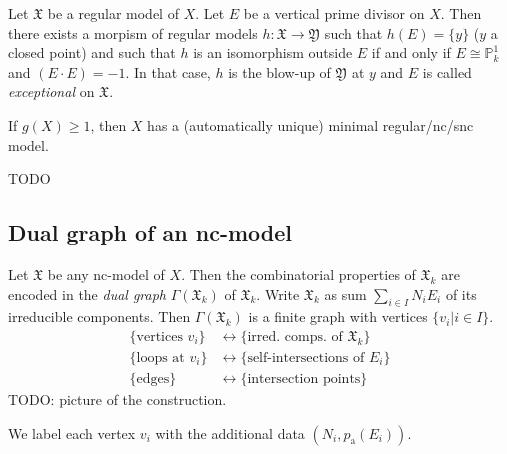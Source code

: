 \begin{theorem}
	Let $\mathfrak{X}$ be a regular model of $X$. Let $E$ be a vertical
	prime divisor on $X$. Then there exists a morpism of regular models $h
	\colon \mathfrak{X} \to \mathfrak{Y}$ such that $h(E) = \{y\}$ ($y$ a
	closed point) and such that $h$ is an isomorphism outside $E$ if and
	only if $E \cong \mathbb{P}^{1}_{k}$ and $(E \cdot E) = -1$. In that
	case, $h$ is the blow-up of $\mathfrak{Y}$ at $y$ and $E$ is called
	\emph{exceptional} on $\mathfrak{X}$.
\end{theorem}

\begin{exercise}
	If $g(X) \ge 1$, then $X$ has a (automatically unique) minimal
	regular/nc/snc model.
	\begin{solution}
		TODO
	\end{solution}
\end{exercise}

\subsection{Dual graph of an nc-model}

Let $\mathfrak{X}$ be any nc-model of $X$. Then the combinatorial properties of
$\mathfrak{X}_{k}$ are encoded in the \emph{dual graph}
$\Gamma(\mathfrak{X}_{k})$ of $\mathfrak{X}_{k}$. Write $\mathfrak{X}_{k}$ as
sum $\sum_{i \in I}N_{i}E_{i}$ of its irreducible components. Then
$\Gamma(\mathfrak{X}_{k})$ is a finite graph with vertices $\{ v_{i} | i \in I
\}$.
\begin{align*}
	\{\text{vertices } v_{i}\} &\longleftrightarrow \{ \text{irred. comps. of $\mathfrak{X}_{k}$} \} \\
	\{\text{loops at } v_{i}\} &\longleftrightarrow \{ \text{self-intersections of $E_{i}$} \} \\
	\{\text{edges} \} &\longleftrightarrow \{ \text{intersection points} \}
\end{align*}
TODO: picture of the construction.

We label each vertex $v_{i}$ with the additional data $(N_{i}, p_{\textrm{a}}(E_{i}))$.

